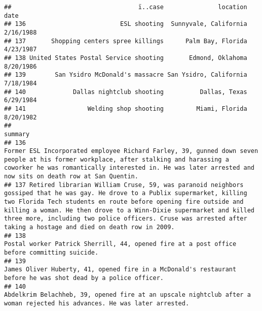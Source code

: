\documentclass[
]{article}
\begin{document}
\begin{verbatim}
##                                   ï..case               location      date
## 136                          ESL shooting  Sunnyvale, California 2/16/1988
## 137       Shopping centers spree killings      Palm Bay, Florida 4/23/1987
## 138 United States Postal Service shooting       Edmond, Oklahoma 8/20/1986
## 139        San Ysidro McDonald's massacre San Ysidro, California 7/18/1984
## 140             Dallas nightclub shooting          Dallas, Texas 6/29/1984
## 141                 Welding shop shooting         Miami, Florida 8/20/1982
##                                                                                                                                                                                                                                                                                                                                                                                          summary
## 136                                                                                                                                            Former ESL Incorporated employee Richard Farley, 39, gunned down seven people at his former workplace, after stalking and harassing a coworker he was romantically interested in. He was later arrested and now sits on death row at San Quentin.
## 137 Retired librarian William Cruse, 59, was paranoid neighbors gossiped that he was gay. He drove to a Publix supermarket, killing two Florida Tech students en route before opening fire outside and killing a woman. He then drove to a Winn-Dixie supermarket and killed three more, including two police officers. Cruse was arrested after taking a hostage and died on death row in 2009.
## 138                                                                                                                                                                                                                                                                                                  Postal worker Patrick Sherrill, 44, opened fire at a post office before committing suicide.
## 139                                                                                                                                                                                                                                                                                James Oliver Huberty, 41, opened fire in a McDonald's restaurant before he was shot dead by a police officer.
## 140                                                                                                                                                                                                                                                                     Abdelkrim Belachheb, 39, opened fire at an upscale nightclub after a woman rejected his advances. He was later arrested.

\end{verbatim}
\end{document}
